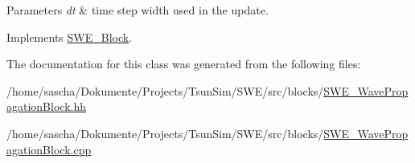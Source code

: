 \begin{DoxyParams}{Parameters}
{\em dt} & time step width used in the update. \\
\hline
\end{DoxyParams}


Implements \hyperlink{classSWE__Block_ab2b4b659f23d5d45413dece8d2da3298}{S\-W\-E\-\_\-\-Block}.



The documentation for this class was generated from the following files\-:\begin{DoxyCompactItemize}
\item 
/home/sascha/\-Dokumente/\-Projects/\-Tsun\-Sim/\-S\-W\-E/src/blocks/\hyperlink{SWE__WavePropagationBlock_8hh}{S\-W\-E\-\_\-\-Wave\-Propagation\-Block.\-hh}\item 
/home/sascha/\-Dokumente/\-Projects/\-Tsun\-Sim/\-S\-W\-E/src/blocks/\hyperlink{SWE__WavePropagationBlock_8cpp}{S\-W\-E\-\_\-\-Wave\-Propagation\-Block.\-cpp}\end{DoxyCompactItemize}
